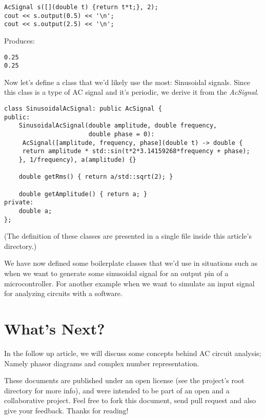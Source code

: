 \documentclass{article}
\begin{document}
	\begin{verbatim}
AcSignal s([](double t) {return t*t;}, 2);
cout << s.output(0.5) << '\n';
cout << s.output(2.5) << '\n';
	\end{verbatim}
	
	Produces:
	
	\begin{verbatim}
0.25
0.25
	\end{verbatim}

	Now let's define a class that we'd likely use the most: Sinusoidal signals. Since this class is a type of AC signal and it's periodic, we derive it from the \textit{AcSignal}.
	
	\begin{verbatim}
class SinusoidalAcSignal: public AcSignal {
public:
    SinusoidalAcSignal(double amplitude, double frequency,
                       double phase = 0):
     AcSignal([amplitude, frequency, phase](double t) -> double {
     return amplitude * std::sin(t*2*3.14159268*frequency + phase);
    }, 1/frequency), a(amplitude) {}

    double getRms() { return a/std::sqrt(2); }

    double getAmplitude() { return a; }
private:
    double a;
};
	\end{verbatim}

	(The definition of these classes are presented in a single file inside this article's directory.)
	
	We have now defined some boilerplate classes that we'd use in situations such as when we want to generate some sinusoidal signal for an output pin of a microcontroller. For another example when we want to simulate an input signal for analyzing circuits with a software.
		
	\section{What's Next?}
	In the follow up article, we will discuss some concepts behind AC circuit analysis; Namely phasor diagrams and complex number representation.
	
	These documents are published under an open license (see the project's root directory for more info), and were intended to be part of an open and a collaborative project. Feel free to fork this document, send pull request and also give your feedback. Thanks for reading!
	
\end{document}
